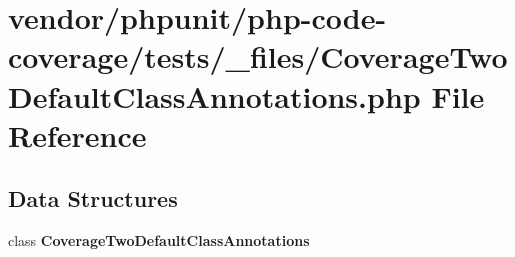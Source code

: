 \section{vendor/phpunit/php-\/code-\/coverage/tests/\+\_\+files/\+Coverage\+Two\+Default\+Class\+Annotations.php File Reference}
\label{php-code-coverage_2tests_2__files_2_coverage_two_default_class_annotations_8php}
\subsection*{Data Structures}
\begin{DoxyCompactItemize}
\item 
class {\bf Coverage\+Two\+Default\+Class\+Annotations}
\end{DoxyCompactItemize}
